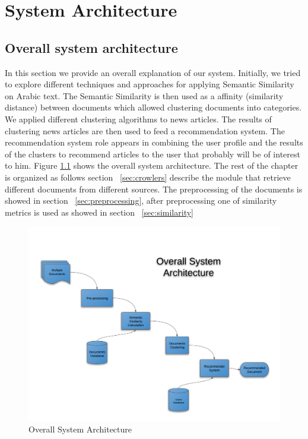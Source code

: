
\chapter{System Architecture} %

\label{sysArch} %


\section{Overall system architecture}
In this section we provide an overall explanation of our system.  Initially, we tried to explore different techniques and approaches for applying Semantic Similarity on Arabic text. The Semantic Similarity is then used as a affinity (similarity distance) between documents which allowed clustering documents into categories. We applied different clustering algorithms to news articles. The results of clustering news articles are then used to feed a recommendation system. The recommendation system role appears in combining the user profile and the results of the clusters to recommend articles to the user that probably will be of interest to him. Figure \ref{fig:arch_1} shows the overall system architecture.
The rest of the chapter is organized as follows section ~\ref{sec:crowlers} describe the module that retrieve different documents from different sources. The preprocessing of the documents is showed in section ~\ref{sec:preprocessing}, after preprocessing one of similarity metrics is used as showed in section ~\ref{sec:similarity}

\begin{figure}[htb]
\begin{center}
\includegraphics[totalheight=.5\textheight,
width=1\textwidth]{./Figures/arch_1.png}
\end{center}
\caption{Overall System Architecture}
\label{fig:arch_1}
\end{figure}



